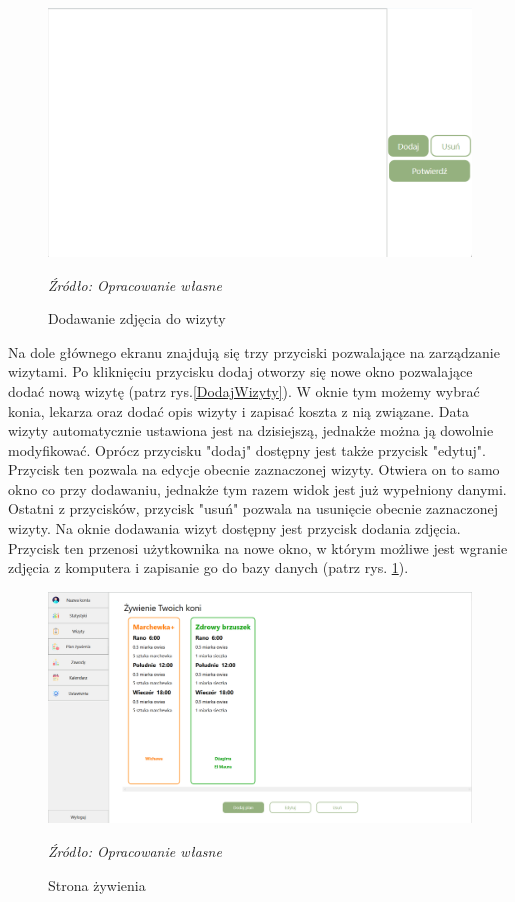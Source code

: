 \documentclass[12pt,oneside]{report}
\begin{document}
\begin{figure}
\centering
\includegraphics[scale=0.6]{zdjęcieWizyta}
\caption{Dodawanie zdjęcia do wizyty}
\textit{Źródło: Opracowanie własne}
\label{Dodaj zdjęcie}
\end{figure}

Na dole głównego ekranu znajdują się trzy przyciski pozwalające na zarządzanie wizytami. Po kliknięciu przycisku dodaj otworzy się nowe okno pozwalające dodać nową wizytę (patrz rys.\ref{DodajWizyty}). W oknie tym możemy wybrać konia, lekarza oraz dodać opis wizyty i zapisać koszta z nią związane. Data wizyty automatycznie ustawiona jest na dzisiejszą, jednakże można ją dowolnie modyfikować. Oprócz przycisku "dodaj" dostępny jest także przycisk "edytuj". Przycisk ten pozwala na edycje obecnie zaznaczonej wizyty. Otwiera on to samo okno co przy dodawaniu, jednakże tym razem widok jest już wypełniony danymi. Ostatni z przycisków, przycisk "usuń" pozwala na usunięcie obecnie zaznaczonej wizyty. {\color{red}Na oknie dodawania wizyt dostępny jest przycisk dodania zdjęcia. Przycisk ten przenosi użytkownika na nowe okno, w którym możliwe jest wgranie zdjęcia z komputera i zapisanie go do bazy danych (patrz rys. \ref{Dodaj zdjęcie}).}

\begin{figure}[h]
	\centering
	\includegraphics[scale=0.4]{Zywienie}
	\caption{Strona żywienia}
	\textit{Źródło: Opracowanie własne}
	\label{Zywienie}
\end{figure}
\end{document}
